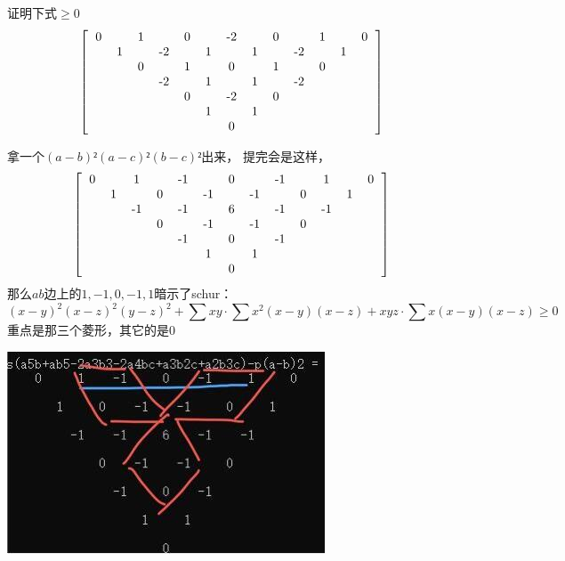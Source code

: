 \documentclass[UTF8]{ctexart}
\begin{document}
证明下式$ \geq 0 $\\
\renewcommand*{\arraystretch}{1.732}\[\left[\begin{matrix}
	\begin{tabular}{ccccccccccccc}
		0&  &1  &  & 0 &  & -2 &  & 0 &  & 1 &  & 0\\
		&1  &  & -2 &  & 1 &  & 1 &  & -2 &  & 1 & \\
		&  & 0 &  & 1 &  &  0&  &  1&  &  0&  & \\
		&  &  &  -2 &  & 1 &  & 1 &  & -2  &  &  & \\
		&  &  &  &  0&  &-2  &  & 0 &  &  &  & \\
		&  &  &  &  &  1&  &1  &  &  &  &  & \\
		&  &  &  &  &  &  0&  &  &  &  &  & \\
	\end{tabular}
\end{matrix}\right]\]

拿一个$ (a-b)²(a-c)²(b-c)² $出来，
提完会是这样，
\renewcommand*{\arraystretch}{1.732}\[\left[\begin{matrix}
	\begin{tabular}{ccccccccccccc}
		0&  &1  &  & -1 &  & 0 &  & -1 &  & 1 &  & 0\\
		&1  &  & 0 &  & -1 &  & -1 &  & 0 &  & 1 & \\
		&  & -1 &  & -1 &  &  6&  &  -1&  &  -1&  & \\
		&  &  &  0 &  & -1 &  & -1 &  & 0  &  &  & \\
		&  &  &  &  -1&  &0  &  & -1 &  &  &  & \\
		&  &  &  &  &  1&  &1  &  &  &  &  & \\
		&  &  &  &  &  &  0&  &  &  &  &  & \\
	\end{tabular}
\end{matrix}\right]\]
那么$ ab $边上的$ 1,-1,0,-1,1 $暗示了schur：
$$ (x-y)^{2}(x-z)^{2}(y-z)^{2}+\displaystyle \sum x y \cdot \displaystyle \sum x^{2}(x-y)(x-z)+x y z \cdot \displaystyle \sum x(x-y)(x-z) \geq 0 $$
重点是那三个菱形，其它的是0
\begin{center}
	\includegraphics[width=0.5\linewidth]{170}
\end{center}
\end{document}
